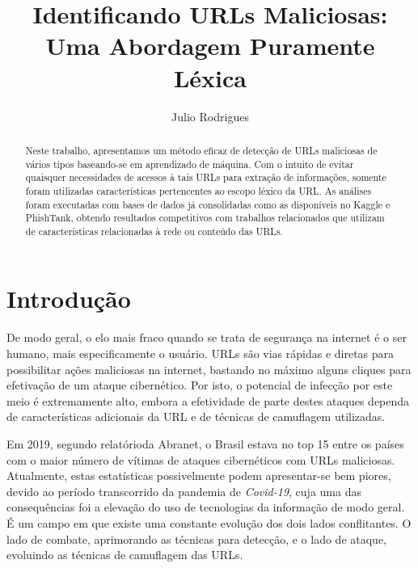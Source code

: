 \documentclass[manuscript,screen,review]{acmart}
\begin{document}
\title{Identificando URLs Maliciosas: Uma Abordagem Puramente Léxica}

\author{Julio Rodrigues}

\renewcommand{\shortauthors}{Rodrigues, J.}

\begin{abstract}
Neste trabalho, apresentamos um método eficaz de detecção de URLs maliciosas de vários tipos baseando-se em aprendizado de máquina. Com o intuito de evitar quaisquer necessidades de acessos à tais URLs para extração de informações, somente foram utilizadas características pertencentes ao escopo léxico da URL. As análises foram executadas com bases de dados já consolidadas como as disponíveis no Kaggle e PhishTank, obtendo resultados competitivos com trabalhos relacionados que utilizam de características relacionadas à rede ou conteúdo das URLs.
\end{abstract}



\maketitle

\section{Introdução}

De modo geral, o elo mais fraco quando se trata de segurança na internet é o ser humano, mais especificamente o usuário. URLs são vias rápidas e diretas para possibilitar ações maliciosas na internet, bastando no máximo alguns cliques para efetivação de um ataque cibernético. Por isto, o potencial de infecção por este meio é extremamente alto, embora a efetividade de parte destes ataques dependa de características adicionais da URL e de técnicas de camuflagem utilizadas.

Em 2019, segundo relatório\footnotemark \hspace{0.1cm}da Abranet, o Brasil estava no top 15 entre os países com o maior número de vítimas de ataques cibernéticos com URLs maliciosas. Atualmente, estas estatísticas possivelmente podem apresentar-se bem piores, devido ao período transcorrido da pandemia de \emph{Covid-19}, cuja uma das consequências foi a elevação do uso de tecnologias da informação de modo geral. É um campo em que existe uma constante evolução dos dois lados conflitantes. O lado de combate, aprimorando as técnicas para detecção, e o lado de ataque, evoluindo as técnicas de camuflagem das URLs.
\end{document}
